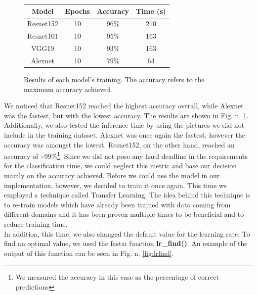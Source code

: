 \documentclass[english]{lni}
\begin{document}
\begin{figure}[ht]
\centering
\begin{tabular}{|c|c|c|c|}
\hline
    Model & Epochs & Accuracy & Time (s)\\
\hline
    Resnet152&10&96\%&210\\
    Resnet101&10&95\%&163\\
    VGG19&10& 93\%&163\\
    Alexnet&10&79\%&64\\
    \hline
\end{tabular}
\caption{Results of each model's training. The accuracy refers to the maximum accuracy achieved.}
\label{tab:training_res}
\end{figure}

We noticed that Resnet152 reached the highest accuracy overall, while Alexnet was the fastest, but with the lowest accuracy. The results are shown in Fig. n. \ref{tab:training_res}. \\
Additionally, we also tested the inference time by using the pictures we did not include in the training dataset. Alexnet was once again the fastest, however the accuracy was amongst the lowest. Resnet152, on the other hand, reached an accuracy of \textasciitilde 99\%\footnote{We measured the accuracy in this case as the percentage of correct predictions}. Since we did not pose any hard deadline in the requirements for the classification time, we could neglect this metric and base our decision mainly on the accuracy achieved. Before we could use the model in our implementation, however, we decided to train it once again. This time we employed a technique called Transfer Learning. The idea behind this technique is to re-train models which have already been trained with data coming from different domains and it has been proven multiple times to be beneficial and to reduce training time. \cite{kocmi2020exploring}\cite{5288526}\\
In addition, this time, we also changed the default value for the learning rate. To find an optimal value, we used the fastai function \textbf{lr\_find()}. An example of the output of this function can be seen in Fig. n. \ref{fig:lrfind}. \\
\end{document}
